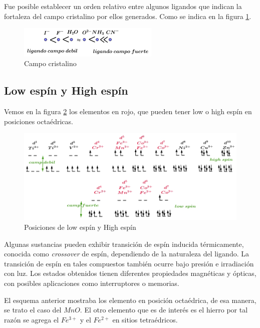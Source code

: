 Fue posible establecer un orden relativo entre algunos ligandos que indican la fortaleza del campo cristalino por ellos generados. Como se indica en la figura \ref{fig:campoCristalino}.

\begin{figure}[H]
    \centering
    \includegraphics[width=0.6\textwidth]{./Figures/campoCristalino}
	\caption{Campo cristalino}
	\label{fig:campoCristalino}
\end{figure}


\subsection{Low espín y High espín}

Vemos en la figura \ref{fig:lowSpinHighSpin} los elementos en rojo, que pueden tener low o high espín en posiciones octaédricas.

\begin{figure}[H]
    \centering
    \includegraphics[width=1.0\textwidth]{./Figures/lowSpinHighSpin}
	\caption{Posiciones de low espín y High espín}
	\label{fig:lowSpinHighSpin}
\end{figure}

Algunas sustancias pueden exhibir transición de espín inducida térmicamente, conocida como \textit{crossover} de espín, dependiendo de la naturaleza del ligando. La transición de espín en tales compuestos también ocurre bajo presión e irradiación con luz. Los estados obtenidos tienen diferentes propiedades magnéticas y ópticas, con posibles aplicaciones como interruptores o memorias.

El esquema anterior mostraba los elemento en posición octaédrica, de esa manera, se trato el caso del $MnO$. El otro elemento que es de interés es el hierro por tal razón se agrega el $Fe^{3+}$ y el $Fe^{2+}$ en sitios
tetraédricos.

